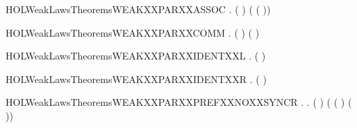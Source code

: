 \newcommand{\HOLWeakLawsTheoremsWEAKXXEXPANSIONXXLAW}{\UseVerbatim{HOLWeakLawsTheoremsWEAKXXEXPANSIONXXLAW}}
\begin{SaveVerbatim}{HOLWeakLawsTheoremsWEAKXXPARXXASSOC}
\HOLTokenTurnstile{} \HOLSymConst{\HOLTokenForall{}}  .  ( \HOLSymConst{\ensuremath{\parallel}}  \HOLSymConst{\ensuremath{\parallel}} ) ( \HOLSymConst{\ensuremath{\parallel}} ( \HOLSymConst{\ensuremath{\parallel}} ))
\end{SaveVerbatim}
\newcommand{\HOLWeakLawsTheoremsWEAKXXPARXXASSOC}{\UseVerbatim{HOLWeakLawsTheoremsWEAKXXPARXXASSOC}}
\begin{SaveVerbatim}{HOLWeakLawsTheoremsWEAKXXPARXXCOMM}
\HOLTokenTurnstile{} \HOLSymConst{\HOLTokenForall{}} .  ( \HOLSymConst{\ensuremath{\parallel}} ) ( \HOLSymConst{\ensuremath{\parallel}} )
\end{SaveVerbatim}
\newcommand{\HOLWeakLawsTheoremsWEAKXXPARXXCOMM}{\UseVerbatim{HOLWeakLawsTheoremsWEAKXXPARXXCOMM}}
\begin{SaveVerbatim}{HOLWeakLawsTheoremsWEAKXXPARXXIDENTXXL}
\HOLTokenTurnstile{} \HOLSymConst{\HOLTokenForall{}}.  ( \HOLSymConst{\ensuremath{\parallel}} ) 
\end{SaveVerbatim}
\newcommand{\HOLWeakLawsTheoremsWEAKXXPARXXIDENTXXL}{\UseVerbatim{HOLWeakLawsTheoremsWEAKXXPARXXIDENTXXL}}
\begin{SaveVerbatim}{HOLWeakLawsTheoremsWEAKXXPARXXIDENTXXR}
\HOLTokenTurnstile{} \HOLSymConst{\HOLTokenForall{}}.  ( \HOLSymConst{\ensuremath{\parallel}} ) 
\end{SaveVerbatim}
\newcommand{\HOLWeakLawsTheoremsWEAKXXPARXXIDENTXXR}{\UseVerbatim{HOLWeakLawsTheoremsWEAKXXPARXXIDENTXXR}}
\begin{SaveVerbatim}{HOLWeakLawsTheoremsWEAKXXPARXXPREFXXNOXXSYNCR}
\HOLTokenTurnstile{} \HOLSymConst{\HOLTokenForall{}} .
        \HOLSymConst{\HOLTokenNotEqual{}}   \HOLSymConst{\HOLTokenImp{}}
       \HOLSymConst{\HOLTokenForall{}} .
            (  \HOLSymConst{\ensuremath{\parallel}}  )
             ( ( \HOLSymConst{\ensuremath{\parallel}}  ) \HOLSymConst{+}
               (  \HOLSymConst{\ensuremath{\parallel}} ))
\end{SaveVerbatim}
